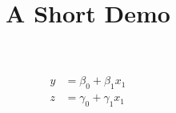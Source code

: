 \documentclass[article]{jss}
\title{A Short Demo}
\begin{document}
\begin{align}
y &= \beta_0 + \beta_1 x_1 \\
z &= \gamma_0 + \gamma_1 x_1
\end{align}
\end{document}
